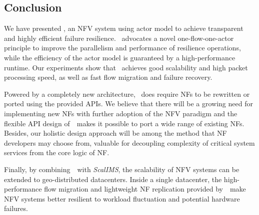 \subsection{Conclusion}

We have presented \nfactor, an NFV system using actor model to achieve transparent and highly efficient failure resilience. \nfactor~advocates a novel one-flow-one-actor principle to improve the parallelism and performance of resilience operations, while the efficiency of the actor model is guaranteed by a high-performance runtime. Our experiments show that \nfactor~achieves good scalability and high packet processing speed, as well as fast flow migration and failure recovery.

Powered by a completely new architecture, \nfactor~does require NFs to be rewritten or ported using the provided APIs. We believe that there will be a growing need for implementing new NFs with further adoption of the NFV paradigm and the flexible API design of~\nfactor~makes it possible to port a wide range of existing NFs. Besides, our holistic design approach will be among the method that NF developers may choose from, valuable for decoupling complexity of critical system services from the core logic of NF. %

Finally, by combining~\nfactor~with \textit{ScalIMS}, the scalability of NFV systems can be extended to geo-distributed datacenters. Inside a single datacenter, the high-performance flow migration and lightweight NF replication provided by~\nfactor~make NFV systems better resilient to workload fluctuation and potential hardware failures. 


